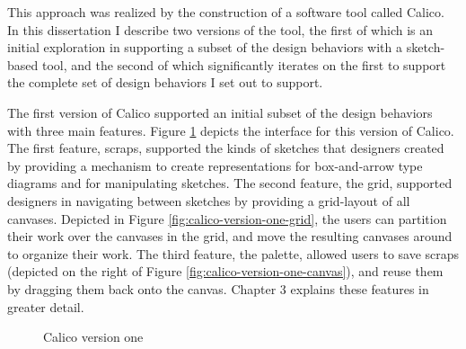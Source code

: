 This approach was realized by the construction of a software tool called Calico. In this dissertation I describe two versions of the tool, the first of which is an initial exploration in supporting a subset of the design behaviors with a sketch-based tool, and the second of which significantly iterates on the first to support the complete set of design behaviors I set out to support. 

The first version of Calico supported an initial subset of the design behaviors with three main features. Figure \ref{fig:calico-version-one} depicts the interface for this version of Calico. The first feature, scraps, supported the kinds of sketches that designers created by providing a mechanism to create representations for box-and-arrow type diagrams and for manipulating sketches. The second feature, the grid, supported designers in navigating between sketches by providing a grid-layout of all canvases. Depicted in Figure \ref{fig:calico-version-one-grid}, the users can partition their work over the canvases in the grid, and move the resulting canvases around to organize their work. The third feature, the palette, allowed users to save scraps (depicted on the right of Figure \ref{fig:calico-version-one-canvas}), and reuse them by dragging them back onto the canvas. Chapter 3 explains these features in greater detail.

\begin{figure}
  \centering
   \caption {Calico version one}
   \label{fig:calico-version-one}
\end{figure}

